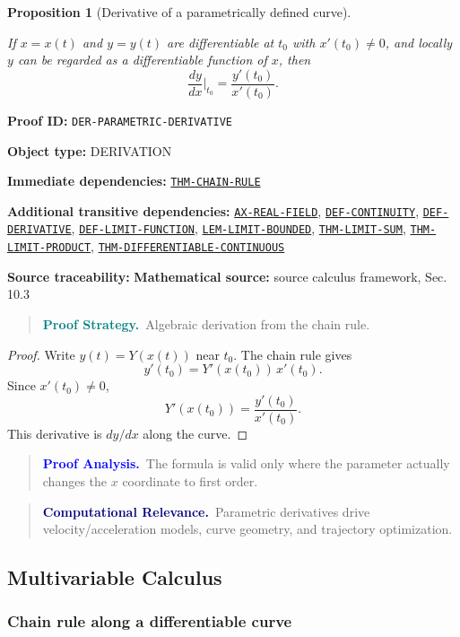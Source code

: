 \documentclass[10pt]{article}
\newcommand{\pidraw}[1]{\begingroup\urlstyle{tt}\nolinkurl{#1}\endgroup}
\newcommand{\pidref}[1]{\hyperref[prf:#1]{\pidraw{#1}}}
\newtheorem{proposition}[theorem]{Proposition}
\theoremstyle{definition}
\theoremstyle{remark}
\newenvironment{proofstrategy}
{\begin{quote}\small\noindent\textbf{\textcolor{teal}{Proof Strategy.}}\ }
{\end{quote}}
\newenvironment{proofanalysis}
{\begin{quote}\small\noindent\textbf{\textcolor{blue}{Proof Analysis.}}\ }
{\end{quote}}
\newenvironment{computationalrelevance}
{\begin{quote}\small\noindent\textbf{\textcolor{navy}{Computational Relevance.}}\ }
{\end{quote}}
\newcommand{\meta}[2]{\noindent\textbf{#1:} #2\par}
\begin{document}
\begin{proposition}[Derivative of a parametrically defined curve]\label{prf:DER-PARAMETRIC-DERIVATIVE}

If $x=x(t)$ and $y=y(t)$ are differentiable at $t_0$ with $x'(t_0)\ne0$, and locally $y$ can be regarded as a differentiable function of $x$, then
\[
\frac{dy}{dx}\Big|_{t_0}=\frac{y'(t_0)}{x'(t_0)}.
\]

\end{proposition}

\meta{Proof ID}{\pidraw{DER-PARAMETRIC-DERIVATIVE}}
\meta{Object type}{DERIVATION}
\meta{Immediate dependencies}{\pidref{THM-CHAIN-RULE}}
\meta{Additional transitive dependencies}{\pidref{AX-REAL-FIELD}, \pidref{DEF-CONTINUITY}, \pidref{DEF-DERIVATIVE}, \pidref{DEF-LIMIT-FUNCTION}, \pidref{LEM-LIMIT-BOUNDED}, \pidref{THM-LIMIT-SUM}, \pidref{THM-LIMIT-PRODUCT}, \pidref{THM-DIFFERENTIABLE-CONTINUOUS}}
\meta{Source traceability}{\textbf{Mathematical source:} source calculus framework, Sec. 10.3}

\begin{proofstrategy}Algebraic derivation from the chain rule.\end{proofstrategy}

\begin{proof}

Write $y(t)=Y(x(t))$ near $t_0$. The chain rule gives
\[
y'(t_0)=Y'(x(t_0))\,x'(t_0).
\]
Since $x'(t_0)\ne0$,
\[
Y'(x(t_0))=\frac{y'(t_0)}{x'(t_0)}.
\]
This derivative is $dy/dx$ along the curve.

\end{proof}

\begin{proofanalysis}The formula is valid only where the parameter actually changes the $x$ coordinate to first order.\end{proofanalysis}

\begin{computationalrelevance}Parametric derivatives drive velocity/acceleration models, curve geometry, and trajectory optimization.\end{computationalrelevance}

\subsection{Multivariable Calculus}

\subsubsection{Chain rule along a differentiable curve}
\end{document}
